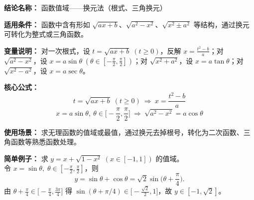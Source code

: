 \textbf{结论名称：} 函数值域——换元法（根式、三角换元）

\textbf{适用条件：} 函数中含有形如 $\sqrt{ax+b}$、$\sqrt{a^2-x^2}$、$\sqrt{x^2\pm a^2}$ 等结构，通过换元可转化为整式或三角函数。

\textbf{变量说明：} 对一次根式，设 $t=\sqrt{ax+b}\;(t\ge0)$，反解 $x=\frac{t^2-b}{a}$；对 $\sqrt{a^2-x^2}$，设 $x=a\sin\theta\;(\theta\in[-\frac{\pi}{2},\frac{\pi}{2}])$；对 $\sqrt{x^2+a^2}$，设 $x=a\tan\theta$；对 $\sqrt{x^2-a^2}$，设 $x=a\sec\theta$。

\textbf{核心公式：}
\[
\boxed{t = \sqrt{ax+b}\;(t\ge 0)\ \Longrightarrow\ x = \frac{t^2-b}{a}}
\]
\[
\boxed{x = a\sin\theta,\ \theta\in\Big[-\frac{\pi}{2},\frac{\pi}{2}\Big]\ \Longrightarrow\ \sqrt{a^2-x^2} = a\cos\theta}
\]

\textbf{使用场景：} 求无理函数的值域或最值，通过换元去掉根号，转化为二次函数、三角函数等熟悉函数处理。

\textbf{简单例子：} 求 $y = x + \sqrt{1-x^2}\;(x\in[-1,1])$ 的值域。\\
令 $x=\sin\theta,\;\theta\in[-\frac{\pi}{2},\frac{\pi}{2}]$，则
\[
y = \sin\theta + \cos\theta = \sqrt{2}\sin\!\Big(\theta+\frac{\pi}{4}\Big).
\]
由 $\theta+\frac{\pi}{4}\in\Big[-\frac{\pi}{4},\frac{3\pi}{4}\Big]$ 得 $\sin(\theta+\pi/4)\in\Big[-\frac{\sqrt{2}}{2},1\Big]$，故 $y\in[-1,\sqrt{2}]$。